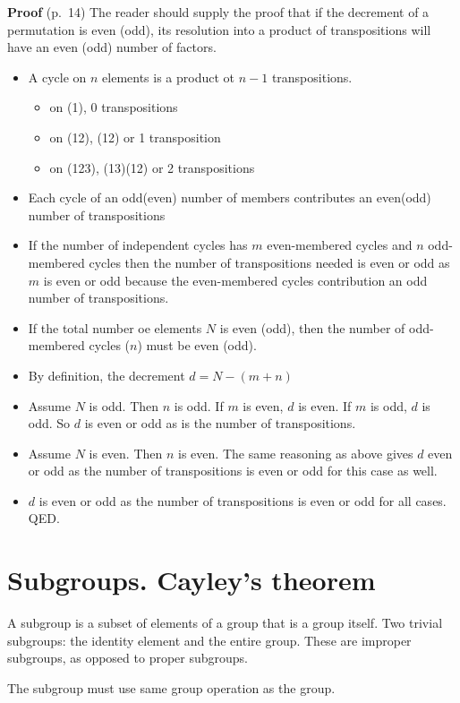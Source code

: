 {\bf Proof} (p.\ 14) The reader should supply the proof that if the
decrement of a permutation is even (odd), its resolution into a product
of transpositions will have an even (odd) number of factors.
\begin{itemize}
\item A cycle on $n$ elements is a product ot $n-1$ transpositions.
  \begin{itemize}
  \item on (1), 0 transpositions
  \item on (12), (12) or 1 transposition
  \item on (123), (13)(12) or 2 transpositions
  \end{itemize}
\item Each cycle of an odd(even) number of members contributes an
  even(odd) number of transpositions
\item If the number of independent cycles has $m$ even-membered cycles
  and $n$ odd-membered cycles then the number of transpositions needed
  is even or odd as $m$ is even or odd because the even-membered
  cycles contribution an odd number of transpositions.
\item If the total number oe elements $N$ is even (odd), then the
  number of odd-membered cycles ($n$) must be even (odd).
\item By definition, the decrement $d = N-(m+n)$
\item Assume $N$ is odd. Then $n$ is odd. If $m$ is even, $d$ is
  even. If $m$ is odd, $d$ is odd. So $d$ is even or odd as is the
  number of transpositions.
\item Assume $N$ is even. Then $n$ is even. The same reasoning as
  above gives $d$ even or odd as the number of transpositions is even
  or odd for this case as well.
\item $d$ is even or odd as the number of transpositions is even or
  odd for all cases. QED.
\end{itemize}

\section{Subgroups. Cayley's theorem}

A subgroup is a subset of elements of a group that is a group
itself. Two trivial subgroups: the identity element and the entire
group. These are improper subgroups, as opposed to proper subgroups.

The subgroup must use same group operation as the group.

